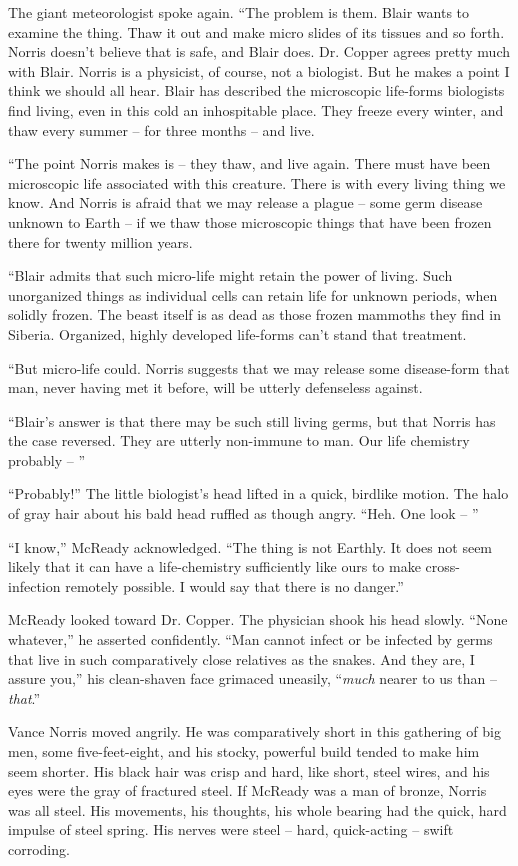 \documentclass[ebook,oneside,11pt]{memoir}				%
\begin{document}
The giant meteorologist spoke again. ``The problem is them. Blair wants to examine the thing. Thaw it out and make micro slides of its tissues and so forth. Norris doesn't believe that is safe, and Blair does. Dr. Copper agrees pretty much with Blair. Norris is a physicist, of course, not a biologist. But he makes a point I think we should all hear. Blair has described the microscopic life-forms biologists find living, even in this cold an inhospitable place. They freeze every winter, and thaw every summer -- for three months -- and live.

``The point Norris makes is -- they thaw, and live again. There must have been microscopic life associated with this creature. There is with every living thing we know. And Norris is afraid that we may release a plague -- some germ disease unknown to Earth -- if we thaw those microscopic things that have been frozen there for twenty million years.

``Blair admits that such micro-life might retain the power of living. Such unorganized things as individual cells can retain life for unknown periods, when solidly frozen. The beast itself is as dead as those frozen mammoths they find in Siberia. Organized, highly developed life-forms can't stand that treatment.

``But micro-life could. Norris suggests that we may release some disease-form that man, never having met it before, will be utterly defenseless against.

``Blair's answer is that there may be such still living germs, but that Norris has the case reversed. They are utterly non-immune to man. Our life chemistry probably -- ''

``Probably!'' The little biologist's head lifted in a quick, birdlike motion. The halo of gray hair about his bald head ruffled as though angry. ``Heh. One look -- ''

``I know,'' McReady acknowledged. ``The thing is not Earthly. It does not seem likely that it can have a life-chemistry sufficiently like ours to make cross-infection remotely possible. I would say that there is no danger.''

McReady looked toward Dr. Copper. The physician shook his head slowly. ``None whatever,'' he asserted confidently. ``Man cannot infect or be infected by germs that live in such comparatively close relatives as the snakes. And they are, I assure you,'' his clean-shaven face grimaced uneasily, ``\emph{much} nearer to us than -- \emph{that}.''

Vance Norris moved angrily. He was comparatively short in this gathering of big men, some five-feet-eight, and his stocky, powerful build tended to make him seem shorter. His black hair was crisp and hard, like short, steel wires, and his eyes were the gray of fractured steel. If McReady was a man of bronze, Norris was all steel. His movements, his thoughts, his whole bearing had the quick, hard impulse of steel spring. His nerves were steel -- hard, quick-acting -- swift corroding.
\end{document}
